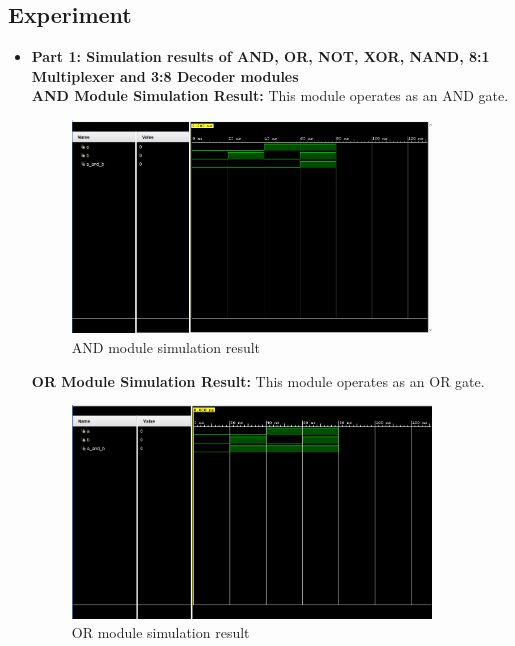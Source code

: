 \documentclass[pdftex,12pt,a4paper]{article}
\begin{document}
\newpage
\subsection{Experiment}
\begin{itemize}
    \item \textbf{Part 1: Simulation results of AND, OR, NOT, XOR, NAND, 8:1 Multiplexer and 3:8 Decoder modules}\\

    \textbf{AND Module Simulation Result:} This module operates as an AND gate.
    \begin{figure}[H]
    \centering
        \includegraphics[width=0.9\textwidth]{AND.png}	
        \caption{AND module simulation result}
        \label{fig1}
   \end{figure}
\newpage
   \textbf{OR Module Simulation Result:} This module operates as an OR gate.
    \begin{figure}[H]
    \centering
        \includegraphics[width=0.9\textwidth]{OR.png}	
        \caption{OR module simulation result}
        \label{fig1}
   \end{figure}


\end{itemize}
\end{document}
